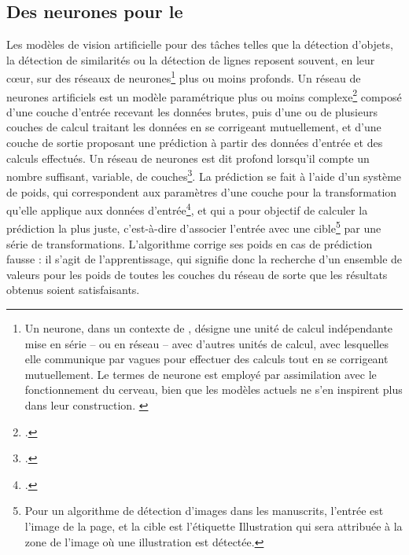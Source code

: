 
	\subsection{Des \og neurones \fg pour le \dl}
	Les modèles de vision artificielle pour des tâches telles que la détection d'objets, la détection de similarités ou la détection de lignes reposent souvent, en leur cœur, sur des réseaux de neurones\footnote{Un neurone, dans un contexte de \ml, désigne une unité de calcul indépendante mise en série -- ou en réseau -- avec d'autres unités de calcul, avec lesquelles elle communique par vagues pour effectuer des calculs tout en se corrigeant mutuellement. Le termes de \og neurone \fg est employé par assimilation avec le fonctionnement du cerveau, bien que les modèles actuels ne s'en inspirent plus dans leur construction. \cite{azencottIntroductionAuMachine2018}} plus ou moins profonds. Un réseau de neurones artificiels est un modèle paramétrique plus ou moins complexe\footcite{azencottIntroductionAuMachine2018} composé d'une couche d'entrée recevant les données brutes, puis d'une ou de plusieurs couches de calcul traitant les données en se corrigeant mutuellement, et d'une couche de sortie proposant une prédiction à partir des données d'entrée et des calculs effectués. Un réseau de neurones est dit \og profond \fg lorsqu'il compte un nombre suffisant, variable, de couches\footcite{azencottIntroductionAuMachine2018}. La prédiction se fait à l'aide d'un système de poids, qui correspondent aux paramètres d'une couche pour la transformation qu'elle applique aux données d'entrée\footcite{cholletApprentissageProfondAvec2020a}, et qui a pour objectif de calculer la prédiction la plus juste, c'est-à-dire d'associer l'entrée avec une cible\footnote{Pour un algorithme de détection d'images dans les manuscrits, l'entrée est l'image de la page, et la cible est l'étiquette \og Illustration \fg qui sera attribuée à la zone de l'image où une illustration est détectée.} par une série de transformations. L'algorithme corrige ses poids en cas de prédiction fausse : il s'agit de l'apprentissage, qui signifie donc la recherche d'un ensemble de valeurs pour les poids de toutes les couches du réseau de sorte que les résultats obtenus soient satisfaisants.
    
